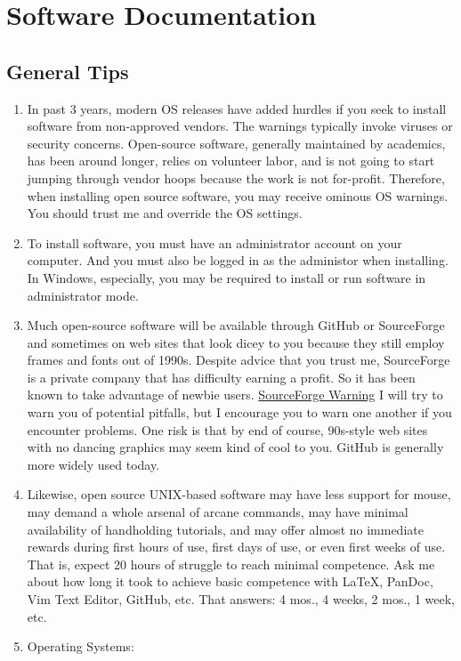 \documentclass[]{article}
\author{}
\date{}
\begin{document}
\section{Software Documentation}\label{software-documentation}

\subsection{General Tips}\label{general-tips}

\begin{enumerate}
\def\labelenumi{\arabic{enumi}.}
\itemsep1pt\parskip0pt
\item
  In past 3 years, modern OS releases have added hurdles if you seek to
  install software from non-approved vendors. The warnings typically
  invoke viruses or security concerns. Open-source software, generally
  maintained by academics, has been around longer, relies on volunteer
  labor, and is not going to start jumping through vendor hoops because
  the work is not for-profit. Therefore, when installing open source
  software, you may receive ominous OS warnings. You should trust me and
  override the OS settings.\\
\item
  To install software, you must have an administrator account on your
  computer. And you must also be logged in as the administor when
  installing. In Windows, especially, you may be required to install or
  run software in administrator mode.
\item
  Much open-source software will be available through GitHub or
  SourceForge and sometimes on web sites that look dicey to you because
  they still employ frames and fonts out of 1990s. Despite advice that
  you trust me, SourceForge is a private company that has difficulty
  earning a profit. So it has been known to take advantage of newbie
  users.
  \href{http://www.gluster.org/2013/08/how-far-the-once-mighty-sourceforge-has-fallen/}{SourceForge
  Warning} I will try to warn you of potential pitfalls, but I encourage
  you to warn one another if you encounter problems. One risk is that by
  end of course, 90s-style web sites with no dancing graphics may seem
  kind of cool to you. GitHub is generally more widely used today.
\item
  Likewise, open source UNIX-based software may have less support for
  mouse, may demand a whole arsenal of arcane commands, may have minimal
  availability of handholding tutorials, and may offer almost no
  immediate rewards during first hours of use, first days of use, or
  even first weeks of use. That is, expect 20 hours of struggle to reach
  minimal competence. Ask me about how long it took to achieve basic
  competence with LaTeX, PanDoc, Vim Text Editor, GitHub, etc. That
  answers: 4 mos., 4 weeks, 2 mos., 1 week, etc.
\item
  Operating Systems:
\end{enumerate}
\end{document}

